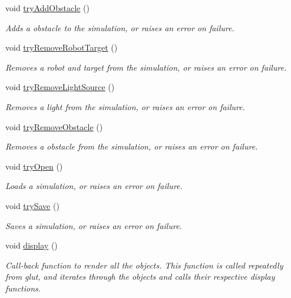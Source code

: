 \begin{DoxyCompactItemize}
void \hyperlink{classSimulation_a1285117bf231d9aa145104256a1cdb36}{try\-Add\-Obstacle} ()
\begin{DoxyCompactList}\small\item\em Adds a obstacle to the simulation, or raises an error on failure. \end{DoxyCompactList}\item 
void \hyperlink{classSimulation_ae5d3e5de317edd69474681812601b2b4}{try\-Remove\-Robot\-Target} ()
\begin{DoxyCompactList}\small\item\em Removes a robot and target from the simulation, or raises an error on failure. \end{DoxyCompactList}\item 
void \hyperlink{classSimulation_a3ea83c539222757b77094aba6a7b92f4}{try\-Remove\-Light\-Source} ()
\begin{DoxyCompactList}\small\item\em Removes a light from the simulation, or raises an error on failure. \end{DoxyCompactList}\item 
void \hyperlink{classSimulation_a9c9922c4e4c4e9a9ceb6ab58adf007ae}{try\-Remove\-Obstacle} ()
\begin{DoxyCompactList}\small\item\em Removes a obstacle from the simulation, or raises an error on failure. \end{DoxyCompactList}\item 
void \hyperlink{classSimulation_ac89e545669001c0f8c9bbbb27a9b15a2}{try\-Open} ()
\begin{DoxyCompactList}\small\item\em Loads a simulation, or raises an error on failure. \end{DoxyCompactList}\item 
void \hyperlink{classSimulation_a46b400f0753d2e434bc82e3824f2d308}{try\-Save} ()
\begin{DoxyCompactList}\small\item\em Saves a simulation, or raises an error on failure. \end{DoxyCompactList}\item 
void \hyperlink{classSimulation_a449dcb7d97dfba99efe770de2f399c31}{display} ()
\begin{DoxyCompactList}\small\item\em Call-\/back function to render all the objects.  This function is called repeatedly from glut, and iterates through the objects and calls their respective display functions. \end{DoxyCompactList}\item 

\end{DoxyCompactItemize}
